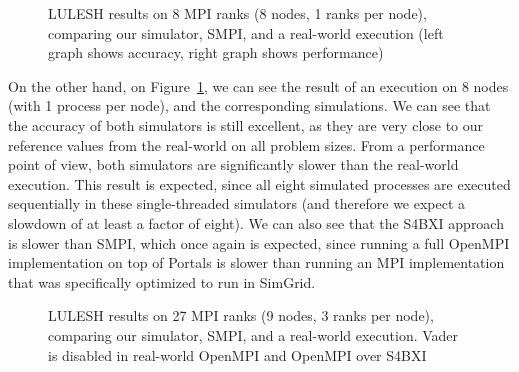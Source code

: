 \begin{figure}[!ht]
    \centering
    \caption{LULESH results on 8 MPI ranks (8 nodes, 1 ranks per node), comparing our simulator, SMPI, and a real-world execution (left graph shows accuracy, right graph shows performance)}
    \label{fig:5_high_level:s4bxi_smpirun_no_vader_8ranks}
\end{figure}

On the other hand, on
Figure~\ref{fig:5_high_level:s4bxi_smpirun_no_vader_8ranks}, we can see the
result of an execution on 8 nodes (with 1 process per node), and the
corresponding simulations. We can see that the accuracy of both simulators is
still excellent, as they are very close to our reference values from the
real-world on all problem sizes. From a performance point of view, both
simulators are significantly slower than the real-world execution. This result
is expected, since all eight simulated processes are executed sequentially in
these single-threaded simulators (and therefore we expect a slowdown of at least
a factor of eight). We can also see that the S4BXI approach is slower than SMPI,
which once again is expected, since running a full OpenMPI implementation on top
of Portals is slower than running an MPI implementation that was specifically
optimized to run in SimGrid.

\begin{figure}[!ht]
    \centering
    \caption{LULESH results on 27 MPI ranks (9 nodes, 3 ranks per node), comparing our simulator, SMPI, and a real-world execution. Vader is disabled in real-world OpenMPI and OpenMPI over S4BXI}
    \label{fig:5_high_level:s4bxi_smpirun_no_vader_27ranks}
\end{figure}

